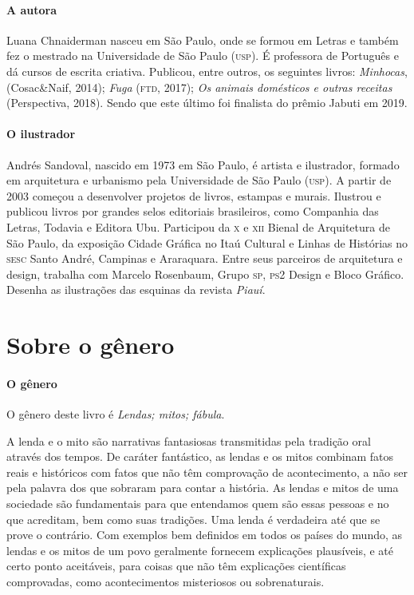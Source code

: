 \documentclass[11pt]{extarticle}
\begin{document}
\paragraph{A autora} Luana Chnaiderman nasceu em São Paulo, onde se formou em Letras e também fez o mestrado na Universidade de São Paulo (\textsc{usp}). É professora de Português e dá cursos de escrita criativa. Publicou, entre outros, os seguintes livros: \textit{Minhocas}, (Cosac\&Naif, 2014); \textit{Fuga} (\textsc{ftd}, 2017); \textit{Os animais domésticos e outras receitas} (Perspectiva, 2018). Sendo que este último foi finalista do prêmio Jabuti em 2019.


\paragraph{O ilustrador} Andrés Sandoval, nascido em 1973 em São Paulo, é artista e ilustrador, formado em arquitetura e urbanismo pela Universidade de São Paulo (\textsc{usp}). A partir de 2003 começou a desenvolver projetos de livros, estampas e murais. Ilustrou e publicou livros por grandes selos editoriais brasileiros, como Companhia das Letras, Todavia e Editora Ubu. Participou da \textsc{x} e \textsc{xii} Bienal de Arquitetura de São Paulo, da exposição Cidade Gráfica no Itaú Cultural e Linhas de Histórias no \textsc{sesc} Santo André, Campinas e Araraquara. Entre seus parceiros de arquitetura e design, trabalha com Marcelo Rosenbaum, Grupo \textsc{sp}, \textsc{ps2} Design e Bloco Gráfico. Desenha as ilustrações das esquinas da revista \textit{Piauí}.



\section{Sobre o gênero}

\paragraph{O gênero} O gênero deste livro é \textit{Lendas; mitos; fábula}. 

A lenda e o mito são narrativas fantasiosas transmitidas pela tradição oral através dos tempos. De caráter fantástico, as lendas e os mitos combinam fatos reais e históricos com fatos que não têm comprovação de acontecimento, a não ser pela palavra dos que sobraram para contar a história. As lendas e mitos de uma sociedade são fundamentais para que entendamos quem são essas pessoas e no que acreditam, bem como suas tradições. Uma lenda é verdadeira até que se prove o contrário. Com exemplos bem definidos em todos os países do mundo, as lendas e os mitos de um povo geralmente fornecem explicações plausíveis, e até certo ponto aceitáveis, para coisas que não têm explicações científicas comprovadas, como acontecimentos misteriosos ou sobrenaturais.
\end{document}
